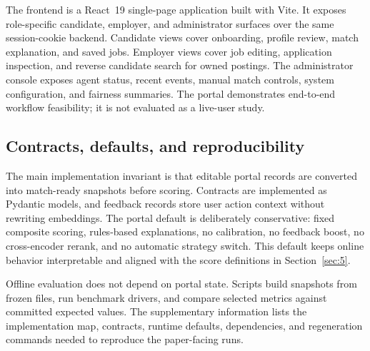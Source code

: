 The frontend is a React~19 single-page application built with Vite.
It exposes role-specific candidate, employer, and administrator surfaces over the same session-cookie backend.
Candidate views cover onboarding, profile review, match explanation, and saved jobs.
Employer views cover job editing, application inspection, and reverse candidate search for owned postings.
The administrator console exposes agent status, recent events, manual match controls, system configuration, and fairness summaries.
The portal demonstrates end-to-end workflow feasibility; it is not evaluated as a live-user study.

\subsection{Contracts, defaults, and reproducibility}\label{sec:4-data}\label{sec:4-params}

The main implementation invariant is that editable portal records are converted into match-ready snapshots before scoring.
Contracts are implemented as Pydantic models, and feedback records store user action context without rewriting embeddings.
The portal default is deliberately conservative: fixed composite scoring, rules-based explanations, no calibration, no feedback boost, no cross-encoder rerank, and no automatic strategy switch.
This default keeps online behavior interpretable and aligned with the score definitions in Section~\ref{sec:5}.

Offline evaluation does not depend on portal state.
Scripts build snapshots from frozen files, run benchmark drivers, and compare selected metrics against committed expected values.
The supplementary information lists the implementation map, contracts, runtime defaults, dependencies, and regeneration commands needed to reproduce the paper-facing runs.
